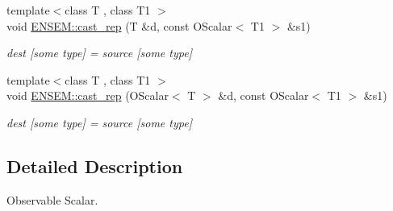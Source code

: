 \begin{DoxyCompactItemize}
{\footnotesize template$<$class T , class T1 $>$ }\\void \mbox{\hyperlink{group__obsscalar_gaf1b78a4937f88c01ae3300374d58d7f2}{E\+N\+S\+E\+M\+::cast\+\_\+rep}} (T \&d, const O\+Scalar$<$ T1 $>$ \&s1)
\begin{DoxyCompactList}\small\item\em dest \mbox{[}some type\mbox{]} = source \mbox{[}some type\mbox{]} \end{DoxyCompactList}\item 
{\footnotesize template$<$class T , class T1 $>$ }\\void \mbox{\hyperlink{group__obsscalar_gaa5f9d1572097c605caade566731fe99a}{E\+N\+S\+E\+M\+::cast\+\_\+rep}} (O\+Scalar$<$ T $>$ \&d, const O\+Scalar$<$ T1 $>$ \&s1)
\begin{DoxyCompactList}\small\item\em dest \mbox{[}some type\mbox{]} = source \mbox{[}some type\mbox{]} \end{DoxyCompactList}\end{DoxyCompactItemize}


\subsection{Detailed Description}
Observable Scalar. 

